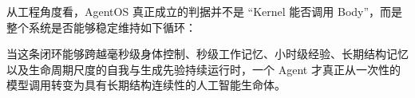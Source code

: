 从工程角度看，AgentOS 真正成立的判据并不是 ``Kernel 能否调用 Body''，而是整个系统是否能够稳定维持如下循环：
\begin{statementbox}
\centering
{}
\end{statementbox}
当这条闭环能够跨越毫秒级身体控制、秒级工作记忆、小时级经验、长期结构记忆以及生命周期尺度的自我与生成先验持续运行时，一个 Agent 才真正从一次性的模型调用转变为具有长期结构连续性的人工智能生命体。
